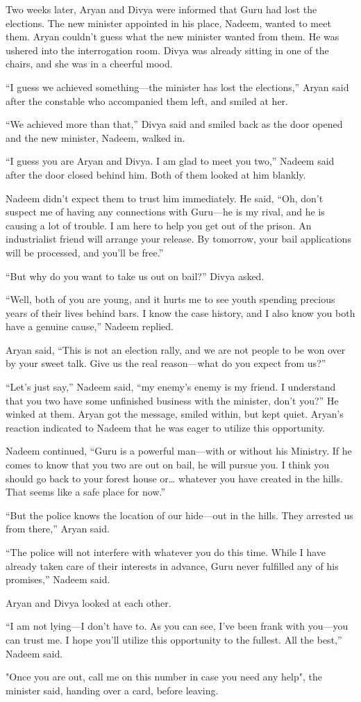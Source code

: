 Two weeks later, Aryan and Divya were informed that Guru had lost the elections.
The new minister appointed in his place, Nadeem, wanted to meet them. Aryan
couldn't guess what the new minister wanted from them. He was ushered into
the interrogation room. Divya was already sitting in one of the chairs, and she
was in a cheerful mood.

“I guess we achieved something—the minister has lost the elections,” Aryan
said after the constable who accompanied them left, and smiled at her.

“We achieved more than that,” Divya said and smiled back as the door opened and
the new minister, Nadeem, walked in.

“I guess you are Aryan and Divya. I am glad to meet you two,” Nadeem said after
the door closed behind him. Both of them looked at him blankly.

Nadeem didn't expect them to trust him immediately. He said, “Oh, don't suspect
me of having any connections with Guru—he is my rival, and he is causing a lot of
trouble. I am here to help you get out of the prison. An industrialist friend
will arrange your release. By tomorrow, your bail applications will be processed,
and you'll be free.”

“But why do you want to take us out on bail?” Divya asked.

“Well, both of you are young, and it hurts me to see youth spending precious
years of their lives behind bars. I know the case history, and I also know you
both have a genuine cause,” Nadeem replied.

Aryan said, “This is not an election rally, and we are not people to be won over
by your sweet talk. Give us the real reason—what do you expect from us?”

“Let's just say,” Nadeem said, “my enemy's enemy is my friend. I understand that
you two have some unfinished business with the minister, don't you?” He winked
at them. Aryan got the message, smiled within, but kept quiet. Aryan's reaction
indicated to Nadeem that he was eager to utilize this opportunity.

Nadeem continued, “Guru is a powerful man—with or without his Ministry. If he
comes to know that you two are out on bail, he will pursue you. I think you
should go back to your forest house or… whatever you have created in the
hills. That seems like a safe place for now.”

“But the police knows the location of our hide—out in the hills. They arrested
us from there,” Aryan said.

“The police will not interfere with whatever you do this time. While I have
already taken care of their interests in advance, Guru never fulfilled any of
his promises,” Nadeem said.

Aryan and Divya looked at each other.

“I am not lying—I don't have to. As you can see, I've been frank with you—you
can trust me. I hope you'll utilize this opportunity to the fullest. All the
best,” Nadeem said.

"Once you are out, call me on this number in case you need any help", the
minister said, handing over a card, before leaving.